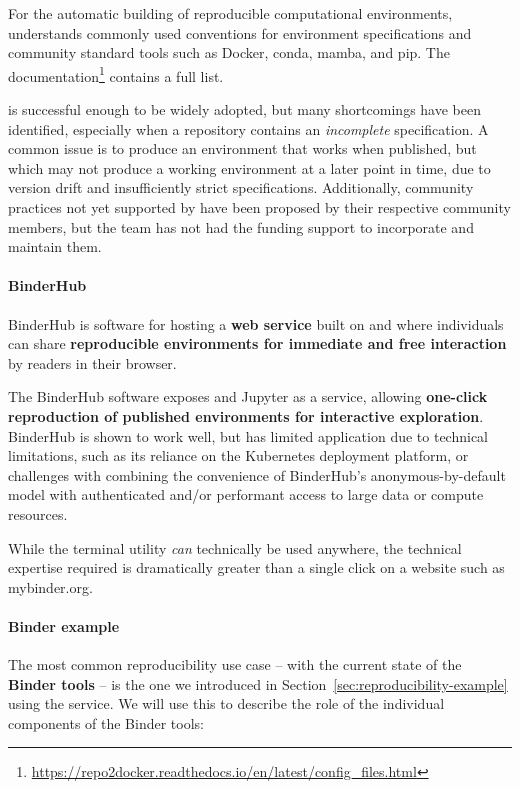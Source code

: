 For the automatic building of reproducible computational environments,
\repotodocker{} understands commonly used conventions for environment specifications and
community standard tools such as Docker, conda, mamba, and pip.
The
documentation\footnote{\url{https://repo2docker.readthedocs.io/en/latest/config_files.html}}
  contains a full list.

\repotodocker{} is successful enough to be widely adopted,
but many shortcomings have been identified,
especially when a repository contains an \emph{incomplete} specification.
A common issue is to produce an environment that works when published,
but which may not produce a working environment at a later point in time,
due to version drift and insufficiently strict specifications.
Additionally, community practices not yet supported by \repotodocker{} have been proposed by their respective community members,
but the \repotodocker{} team has not had the funding support to incorporate and maintain them.

\paragraph{BinderHub}\label{sec:binderhub}
BinderHub is software for hosting a \textbf{web service} built on \repotodocker{} and
\JupyterHub{} where individuals can share \textbf{reproducible environments for
immediate and free interaction} by readers in their browser.

The BinderHub software exposes \repotodocker{} and Jupyter as a service,
allowing \textbf{one-click reproduction of published environments for interactive exploration}.
BinderHub is shown to work well,
but has limited application due to technical limitations,
such as its reliance on the Kubernetes deployment platform,
or challenges with combining the convenience of BinderHub's anonymous-by-default model
with authenticated and/or performant access to large data or compute resources.

While the \repotodocker{} terminal utility \emph{can} technically be used anywhere,
the technical expertise required is dramatically greater than a single click on a website such as mybinder.org.

\paragraph{Binder example}
\label{binder-how-does-it-work}

The most common reproducibility use case -- with the current state of the
\textbf{Binder tools} -- is the one we introduced in
Section~\ref{sec:reproducibility-example} using the \mybinder{} service. We will use this to
describe the role of the individual components of the Binder tools:

